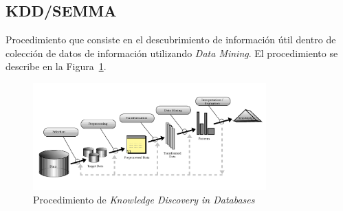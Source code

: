 \subsection{KDD/SEMMA}
Procedimiento que consiste en el descubrimiento de información útil dentro de colección de datos de información utilizando \textit{Data Mining}. El procedimiento se describe en la Figura~\ref{fig:kdd}.
\begin{figure}[H]
  \centering
    \includegraphics[width=0.8\textwidth]{Figuras/kdd-process}
      \caption{Procedimiento de \textit{Knowledge Discovery in Databases}\cite{kdd}}
    \label{fig:kdd}
\end{figure}

